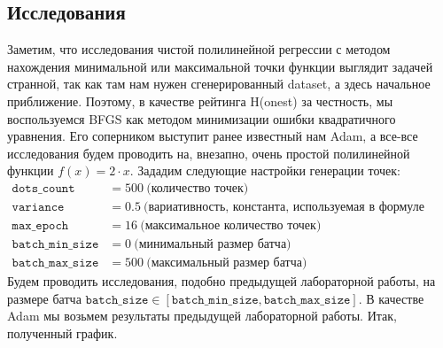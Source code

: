 \documentclass[12pt, a4paper, oneside, final]{article}
\begin{document}
	\subsection*{Исследования}
	Заметим, что исследования чистой полилинейной регрессии с методом нахождения минимальной или максимальной точки функции выглядит задачей странной, так как там нам нужен сгенерированный dataset, а здесь начальное приближение.
	Поэтому, в качестве рейтинга H(onest) за честность, мы воспользуемся BFGS как методом минимизации ошибки квадратичного уравнения.
	Его соперником выступит ранее известный нам Adam, а все-все исследования будем проводить на, внезапно, очень простой полилинейной функции $f(x) = 2 \cdot x$.
	Зададим следующие настройки генерации точек:
	\begin{align*}
		\mathtt{dots\_count} &= 500~\text{(количество точек)} \\
		\mathtt{variance}    &= 0.5~\text{(вариативность, константа, используемая в формуле генерации)} \\
		\mathtt{max\_epoch}  &= 16~\text{(максимальное количество точек)} \\
		\mathtt{batch\_min\_size} &= 0~\text{(минимальный размер батча)} \\
		\mathtt{batch\_max\_size} &= 500~\text{(максимальный размер батча)}
	\end{align*}
	Будем проводить исследования, подобно предыдущей лабораторной работы, на размере батча $\mathtt{batch\_size} \in [\mathtt{batch\_min\_size}, \mathtt{batch\_max\_size}]$.
	В качестве Adam мы возьмем результаты предыдущей лабораторной работы.
	Итак, полученный график.
\end{document}
